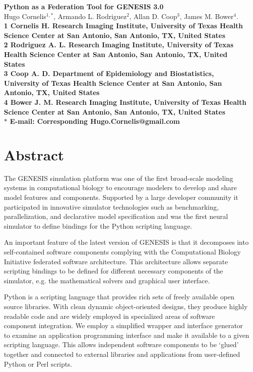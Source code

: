 \documentclass[10pt]{article}
\date{}
\begin{document}
\begin{flushleft}
{\Large
\textbf{Python as a Federation Tool for GENESIS 3.0}
}
\\
Hugo Cornelis$^{1,\ast}$, 
Armando L. Rodriguez$^{2}$, 
Allan D. Coop$^{3}$,
James M. Bower$^{4}$.
\\
\bf{1} Cornelis H. Research Imaging Institute, University of Texas Health Science Center at San Antonio, San Antonio, TX, United States
\\
\bf{2} Rodriguez A. L. Research Imaging Institute, University of Texas Health Science Center at San Antonio, San Antonio, TX, United States
\\
\bf{3} Coop A. D. Department of Epidemiology and Biostatistics, University of Texas Health Science Center at San Antonio, San Antonio, TX, United States
\\
\bf{4} Bower J. M. Research Imaging Institute, University of Texas Health Science Center at San Antonio, San Antonio, TX, United States
\\
$\ast$ E-mail: Corresponding Hugo.Cornelis@gmail.com
\end{flushleft}

\section*{Abstract}

The GENESIS simulation platform was one of the first
broad-scale modeling systems in computational biology to encourage
modelers to develop and share model features and components.
Supported by a large developer community it
participated in innovative simulator technologies such as
benchmarking, parallelization, and declarative model specification and was the first neural simulator to define bindings for the Python scripting language.

An important feature of the latest version of GENESIS is
that it decomposes into self-contained software components
complying with the Computational Biology Initiative federated software
architecture.  This architecture allows separate scripting bindings to be
defined for different necessary components of the simulator, e.g. the mathematical solvers and graphical user interface.

Python is a scripting language that provides rich sets of
freely available open source libraries. With clean dynamic object-oriented
designs, they produce highly readable
code and are widely employed in specialized areas of
software component integration. We employ a simplified wrapper and interface generator to examine an application
programming interface and make it available to a given scripting
language.  This allows independent software components
to be `glued' together and connected to
external libraries and applications from user-defined Python or Perl scripts.
\end{document}
